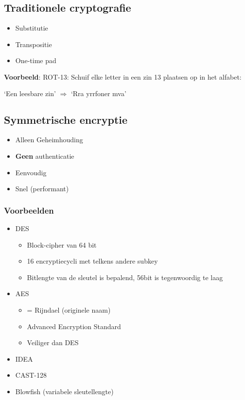 \documentclass{article}
\newcommand{\bold}[1]{\textbf{#1}}
\begin{document}
\subsection{Traditionele cryptografie}

\begin{itemize}
    \item Substitutie
    \item Transpositie
    \item One-time pad
\end{itemize}

\bold{Voorbeeld}: ROT-13: Schuif elke letter in een zin 13 plaatsen op in het alfabet:

`Een leesbare zin' $\Rightarrow$ `Rra yrrfoner mva'

\subsection{Symmetrische encryptie}

\begin{itemize}
    \item Alleen Geheimhouding
    \item \bold{Geen} authenticatie
    \item Eenvoudig
    \item Snel (performant)
\end{itemize}

\subsubsection{Voorbeelden}

\begin{itemize}
    \item DES
    \begin{itemize}
        \item Block-cipher van 64 bit
        \item 16 encryptiecycli met telkens andere subkey
        \item Bitlengte van de sleutel is bepalend, 56bit is tegenwoordig te laag
    \end{itemize}
    \item AES
    \begin{itemize}
        \item = Rijndael (originele naam)
        \item Advanced Encryption Standard
        \item Veiliger dan DES
    \end{itemize}
    \item IDEA
    \item CAST-128
    \item Blowfish (variabele sleutellengte)
\end{itemize}
\end{document}
